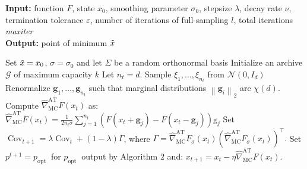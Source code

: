 \begin{algorithm}[h]
\caption{ASEBO algorithm}\label{ASEBO}

\hspace*{\algorithmicindent} \textbf{Input:} function $F$, state $x_0$, smoothing parameter $\sigma_0$, stepsize $\lambda$, decay rate $\nu$, termination tolerance $\varepsilon$, number of iterations of full-sampling $l$, total iterations \textit{maxiter}\\
\hspace*{\algorithmicindent} \textbf{Output:} point of minimum $\Tilde{x}$
\begin{algorithmic}[1]

\State Set $\Tilde{x} = x_0$, $\sigma = \sigma_0$ and let $\Sigma$ be a random orthonormal basis
\State Initialize an archive $\mathcal{G}$ of maximum capacity $k$
        \State Let $n_t = d$. Sample $\xi_1,\dots,\xi_{n_t}$ from $\mathcal{N}(0,I_d)$
    \Else
        \State {}
        \State {}
        \State {}
        \State Renormalize $ \mathbf{g}_{1}, \ldots, \mathbf{g}_{n_{t}} $ such that marginal distributions $ \left\|\mathbf{g}_{i}\right\|_{2} $ are $ \chi(d) $.
    \EndIf
    \State Compute $ \widehat{\nabla}_{\mathrm{MC}}^{\mathrm{AT}} F\left(x_{t}\right) $ as: $ \widehat{\nabla}_{\mathrm{MC}}^{\mathrm{AT}} F\left(x_{t}\right)=\frac{1}{2 n_{t} \sigma} \sum_{j=1}^{n_{t}}\left(F\left(x_{t}+\mathbf{g}_{j}\right)-F\left(x_{t}-\mathbf{g}_{j}\right)\right) \mathrm{g}_{j} $
    \State Set $ \operatorname{Cov}_{t+1}=\lambda \operatorname{Cov}_{t}+(1-\lambda) \Gamma $, where $ \Gamma=\widehat{\nabla}_{\mathrm{MC}}^{\mathrm{AT}} F_{\sigma}\left(x_{t}\right)\left(\widehat{\nabla}_{\mathrm{MC}}^{\mathrm{AT}} F_{\sigma}\left(x_{t}\right)\right)^{\top} . $
    \State Set $ p^{t+1}=p_{\text {opt }} $ for $ p_{\text {opt }} $ output by Algorithm 2 and: $ x_{t+1} = x_{t} - \eta \widehat{\nabla}_{\mathrm{MC}}^{\mathrm{AT}} F\left(x_{t}\right) $.
    

\end{algorithmic}
\end{algorithm}
